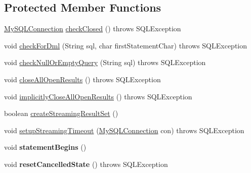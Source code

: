 \subsection*{Protected Member Functions}
\begin{DoxyCompactItemize}
\item 
\mbox{\hyperlink{interfacecom_1_1mysql_1_1jdbc_1_1_my_s_q_l_connection}{My\+S\+Q\+L\+Connection}} \mbox{\hyperlink{classcom_1_1mysql_1_1jdbc_1_1_statement_impl_a88caedee8619aad1351c9edea352c37e}{check\+Closed}} ()  throws S\+Q\+L\+Exception 
\item 
void \mbox{\hyperlink{classcom_1_1mysql_1_1jdbc_1_1_statement_impl_a9f707faf90e18c724869f1745933c1df}{check\+For\+Dml}} (String sql, char first\+Statement\+Char)  throws S\+Q\+L\+Exception 
\item 
void \mbox{\hyperlink{classcom_1_1mysql_1_1jdbc_1_1_statement_impl_a29ea5f4b5f00602d6b7845623c616a7d}{check\+Null\+Or\+Empty\+Query}} (String sql)  throws S\+Q\+L\+Exception 
\item 
void \mbox{\hyperlink{classcom_1_1mysql_1_1jdbc_1_1_statement_impl_a62c86a98fa9bd9792873a0d160e7ef59}{close\+All\+Open\+Results}} ()  throws S\+Q\+L\+Exception 
\item 
void \mbox{\hyperlink{classcom_1_1mysql_1_1jdbc_1_1_statement_impl_aeb89691311bd70ba70c7e4bfd510a182}{implicitly\+Close\+All\+Open\+Results}} ()  throws S\+Q\+L\+Exception 
\item 
boolean \mbox{\hyperlink{classcom_1_1mysql_1_1jdbc_1_1_statement_impl_a642ade7ecee90913b8de38602c43ce20}{create\+Streaming\+Result\+Set}} ()
\item 
void \mbox{\hyperlink{classcom_1_1mysql_1_1jdbc_1_1_statement_impl_ab0949d4db6b617c32d22ace0ed1a7ac7}{setup\+Streaming\+Timeout}} (\mbox{\hyperlink{interfacecom_1_1mysql_1_1jdbc_1_1_my_s_q_l_connection}{My\+S\+Q\+L\+Connection}} con)  throws S\+Q\+L\+Exception 
\item 
\mbox{\label{classcom_1_1mysql_1_1jdbc_1_1_statement_impl_a28eceaa6cab6c6a142b42f5da584487d}} 
void {\bfseries statement\+Begins} ()
\item 
\mbox{\label{classcom_1_1mysql_1_1jdbc_1_1_statement_impl_a7c39d95a9cde2ceb1707c092cc1bcad3}} 
void {\bfseries reset\+Cancelled\+State} ()  throws S\+Q\+L\+Exception 
\item 
\mbox{\label{classcom_1_1mysql_1_1jdbc_1_1_statement_impl_a3e483697a04ed8f867609b1a0b9013c4}} 

\end{DoxyCompactItemize}
